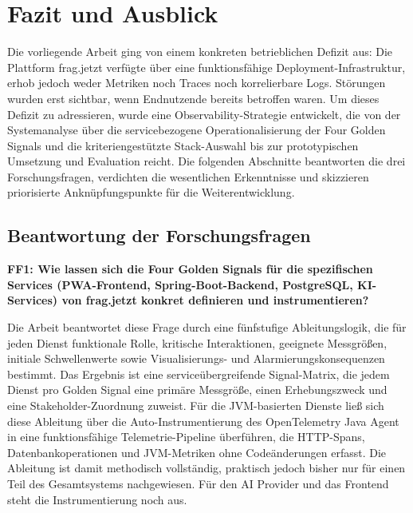  
\chapter{Fazit und Ausblick}
 
Die vorliegende Arbeit ging von einem konkreten betrieblichen Defizit aus: Die Plattform frag.jetzt verfügte über eine funktionsfähige Deployment-Infrastruktur, erhob jedoch weder Metriken noch Traces noch korrelierbare Logs. Störungen wurden erst sichtbar, wenn Endnutzende bereits betroffen waren. Um dieses Defizit zu adressieren, wurde eine Observability-Strategie entwickelt, die von der Systemanalyse über die servicebezogene Operationalisierung der Four Golden Signals und die kriteriengestützte Stack-Auswahl bis zur prototypischen Umsetzung und Evaluation reicht. Die folgenden Abschnitte beantworten die drei Forschungsfragen, verdichten die wesentlichen Erkenntnisse und skizzieren priorisierte Anknüpfungspunkte für die Weiterentwicklung.
 
 
\section{Beantwortung der Forschungsfragen}
 
\textbf{FF1: Wie lassen sich die Four Golden Signals für die spezifischen Services (PWA-Frontend, Spring-Boot-Backend, PostgreSQL, KI-Services) von frag.jetzt konkret definieren und instrumentieren?}
 
Die Arbeit beantwortet diese Frage durch eine fünfstufige Ableitungslogik, die für jeden Dienst funktionale Rolle, kritische Interaktionen, geeignete Messgrößen, initiale Schwellenwerte sowie Visualisierungs- und Alarmierungskonsequenzen bestimmt. Das Ergebnis ist eine serviceübergreifende Signal-Matrix, die jedem Dienst pro Golden Signal eine primäre Messgröße, einen Erhebungszweck und eine Stakeholder-Zuordnung zuweist. Für die JVM-basierten Dienste ließ sich diese Ableitung über die Auto-Instrumentierung des OpenTelemetry Java Agent in eine funktionsfähige Telemetrie-Pipeline überführen, die HTTP-Spans, Datenbankoperationen und JVM-Metriken ohne Codeänderungen erfasst. Die Ableitung ist damit methodisch vollständig, praktisch jedoch bisher nur für einen Teil des Gesamtsystems nachgewiesen. Für den AI Provider und das Frontend steht die Instrumentierung noch aus.
 

